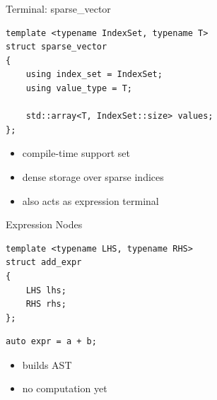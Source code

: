 \documentclass{beamer}
\begin{document}

\begin{frame}[fragile]{Terminal: sparse\_vector}
\begin{lstlisting}
template <typename IndexSet, typename T>
struct sparse_vector
{
    using index_set = IndexSet;
    using value_type = T;

    std::array<T, IndexSet::size> values;
};
\end{lstlisting}

\vspace{1em}

\begin{itemize}
\item compile-time support set
\item dense storage over sparse indices
\item also acts as expression terminal
\end{itemize}

\end{frame}


\begin{frame}[fragile]{Expression Nodes}
\begin{lstlisting}
template <typename LHS, typename RHS>
struct add_expr
{
    LHS lhs;
    RHS rhs;
};
\end{lstlisting}

\vspace{1em}

\begin{lstlisting}
auto expr = a + b;
\end{lstlisting}

\vspace{1em}

\begin{itemize}
\item builds AST
\item no computation yet
\end{itemize}

\end{frame}

\end{document}
